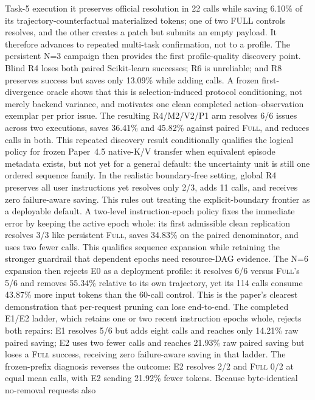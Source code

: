 \documentclass[11pt]{article}
\begin{document}
Task-5 execution it preserves official resolution in 22 calls while saving
6.10\% of its trajectory-counterfactual materialized tokens; one of two FULL
controls resolves, and the other creates a patch but submits an empty payload.
It therefore advances to repeated multi-task confirmation, not to a profile.
The persistent N=3 campaign then provides the first profile-quality discovery
point.  Blind R4 loses both paired Scikit-learn successes; R6 is unreliable;
and R8 preserves success but saves only 13.09\% while adding calls.  A frozen
first-divergence oracle shows that this is selection-induced protocol
conditioning, not merely backend variance, and motivates one clean completed
action--observation exemplar per prior issue.  The resulting R4/M2/V2/P1 arm
resolves 6/6 issues across two executions, saves 36.41\% and 45.82\% against
paired \textsc{Full}, and reduces calls in both.  This repeated discovery result
conditionally qualifies the logical policy for frozen Paper~4.5 native-K/V
transfer when equivalent episode metadata exists, but not yet for a general
default: the uncertainty unit is still one ordered sequence family.  In the
realistic boundary-free setting, global R4 preserves all user instructions yet
resolves only 2/3, adds 11 calls, and receives zero failure-aware saving.  This
rules out treating the explicit-boundary frontier as a deployable default.  A
two-level instruction-epoch policy fixes the immediate error by keeping the
active epoch whole: its first admissible clean replication resolves 3/3 like
persistent \textsc{Full}, saves 34.83\% on the paired denominator, and uses two
fewer calls.  This qualifies sequence expansion while retaining the stronger
guardrail that dependent epochs need resource-DAG evidence.  The N=6 expansion
then rejects E0 as a deployment profile: it resolves 6/6 versus \textsc{Full}'s
5/6 and removes 55.34\% relative to its own trajectory, yet its 114 calls
consume 43.87\% more input tokens than the 60-call control.  This is the
paper's clearest demonstration that per-request pruning can lose end-to-end.
The completed E1/E2 ladder, which retains one or two recent instruction epochs
whole, rejects both repairs: E1 resolves 5/6 but adds eight calls and reaches
only 14.21\% raw paired saving; E2 uses two fewer calls and reaches 21.93\%
raw paired saving but loses a \textsc{Full} success, receiving zero
failure-aware saving in that ladder.  The frozen-prefix diagnosis reverses the
outcome: E2 resolves 2/2 and \textsc{Full} 0/2 at equal mean calls, with E2
sending 21.92\% fewer tokens.  Because byte-identical no-removal requests also
\end{document}
